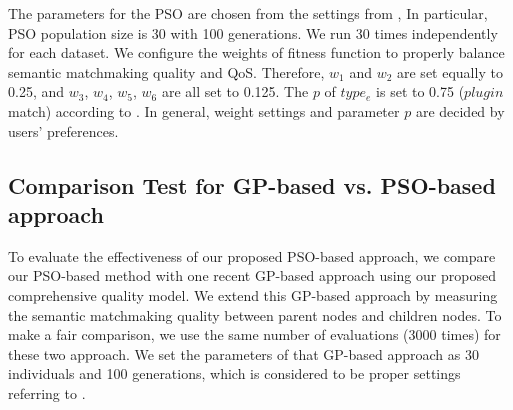 \documentclass{llncs}
\begin{document}
The parameters for the PSO are chosen from the settings from \cite{shi2001particle}, In particular, PSO population size is 30 with 100 generations. We run 30 times independently for each dataset. We configure the weights of fitness function to properly balance semantic matchmaking quality and QoS. Therefore, $w_{1}$ and $w_{2}$ are set equally to 0.25, and $w_{3}$, $w_{4}$, $w_{5}$, $w_{6}$ are all set to 0.125. The $p$ of $type_e$ is set to 0.75 ($plugin$ match) according to \cite{lecue2009optimizing}. In general, weight settings and parameter $p$ are decided by users' preferences.

\vspace{-0.5cm}
\subsection{Comparison Test for GP-based vs. PSO-based approach}\label{comparisonTestWithGP}
To evaluate the effectiveness of our proposed PSO-based approach, we compare our PSO-based method with one recent GP-based approach \cite{ma2015hybrid} using our proposed comprehensive quality model. We extend this GP-based approach by measuring the semantic matchmaking quality between parent nodes and children nodes. To make a fair comparison, we use the same number of evaluations (3000 times) for these two approach. We set the parameters of that GP-based approach as 30 individuals and 100 generations, which is considered to be proper settings referring to \cite{da2015gp}.
\end{document}
